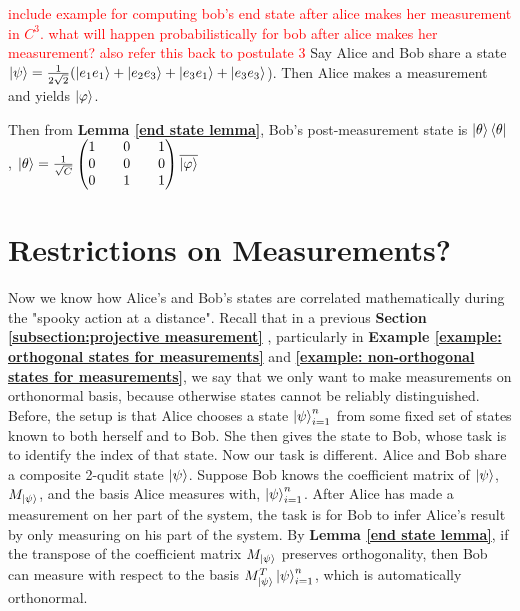 \begin{example}
\textcolor{red}{include example for computing bob's end state after alice makes her measurement in $C^3$. what will happen probabilistically for bob after alice makes her measurement? also refer this back to postulate 3}
Say Alice and Bob share a state $\ket{\psi}=\frac{1}{2\sqrt{2}}(\ket{e_1 e_1}+\ket{e_2 e_3}+\ket{e_3 e_1}+\ket{e_3 e_3}$). Then Alice makes a measurement and yields $\ket{\varphi}$. 

Then from \textbf{Lemma \ref{end state lemma}}, Bob's post-measurement state is $\ket{\theta}\bra{\theta}$, $\ket{\theta}=\frac{1}{\sqrt{C}}\begin{pmatrix}
1 && 0 && 1\\
0 && 0 && 0\\
0 && 1 && 1\\
\end{pmatrix}\overline{\ket{\varphi}}$
\end{example}


\section{Restrictions on Measurements?}
Now we know how Alice's and Bob's states are correlated mathematically during the "spooky action at a distance". Recall that in a previous \textbf{Section \ref{subsection:projective measurement}} , particularly in \textbf{Example \ref{example: orthogonal states for measurements}} and \textbf{\ref{example: non-orthogonal states for measurements}}, we say that we only want to make measurements on orthonormal basis, because otherwise states cannot be reliably distinguished. Before, the setup is that Alice chooses a state $\ket{\psi}_{i=1}^n$ from some fixed set of states known to both herself and to Bob. She then gives the state to Bob, whose task is to identify the index of that state. Now our task is different. Alice and Bob share a composite 2-qudit state $\ket{\psi}$. Suppose Bob knows the coefficient matrix of $\ket{\psi}$, $M_{\ket{\psi}}$, and the basis Alice measures with, $\ket{\psi}_{i=1}^n$. After Alice has made a measurement on her part of the system, the task is for Bob to infer Alice's result by only measuring on his part of the system. By \textbf{Lemma \ref{end state lemma}}, if the transpose of the coefficient matrix $M_{\ket{\psi}}$ preserves orthogonality, then Bob can measure with respect to the basis $M_{\ket{\psi}}^T \ket{\psi}_{i=1}^n$, which is automatically orthonormal. 

